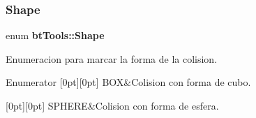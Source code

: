 \subsubsection{Shape}
{\footnotesize\ttfamily enum \textbf{ bt\+Tools\+::\+Shape}}

Enumeracion para marcar la forma de la colision. \begin{DoxyEnumFields}{Enumerator}
[0pt][0pt]{}\mbox{\label{namespacebt_tools_a578fa8d9ff62284e4a685a58bad0e845a5db7820c658ee82c0734927434812928}} 
B\+OX&Colision con forma de cubo. \\
\hline

[0pt][0pt]{}\mbox{\label{namespacebt_tools_a578fa8d9ff62284e4a685a58bad0e845ab97d403a98ac5a7cb28efde41971dfdf}} 
S\+P\+H\+E\+RE&Colision con forma de esfera. \\
\hline

\end{DoxyEnumFields}
